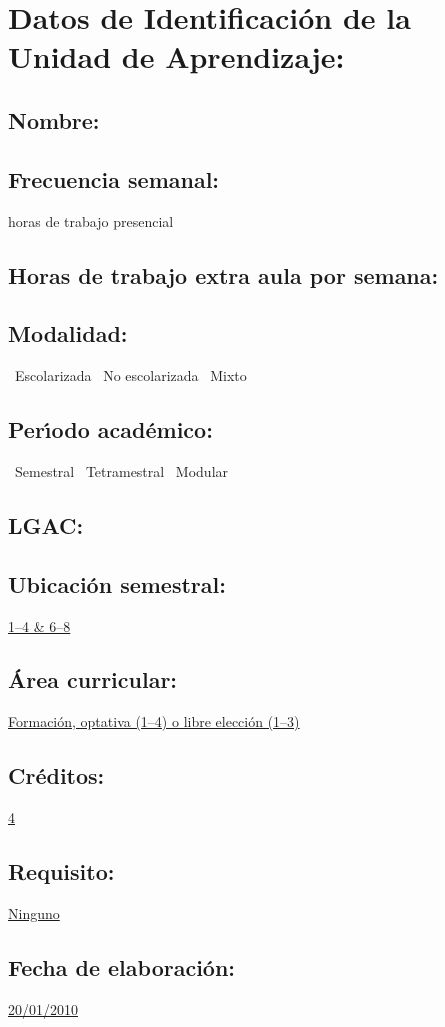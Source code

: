 \documentclass[10 pt]{article}
\begin{document}

\section{Datos de Identificaci\'{o}n de la Unidad de Aprendizaje:}
\subsection{Nombre:} 
\subsection{Frecuencia semanal:} horas de trabajo presencial 
\subsection{Horas de trabajo extra aula por semana:} 
\subsection{Modalidad:} \yes~Escolarizada \no~No escolarizada \no~Mixto
\subsection{Per\'{\i}odo acad\'{e}mico:} \yes~Semestral
\no~Tetramestral \no~Modular
\subsection{LGAC:} \underline{\seys}
\subsection{Ubicaci\'{o}n semestral:} \underline{1--4 \& 6--8}
\subsection{\'{A}rea curricular:} \underline{Formaci\'{o}n, optativa (1--4) o libre
  elecci\'{o}n (1--3)}
\subsection{Cr\'{e}ditos:} \underline{4}
\subsection{Requisito:} \underline{Ninguno}
\subsection{Fecha de elaboraci\'{o}n:} \underline{20/01/2010}
\end{document}
